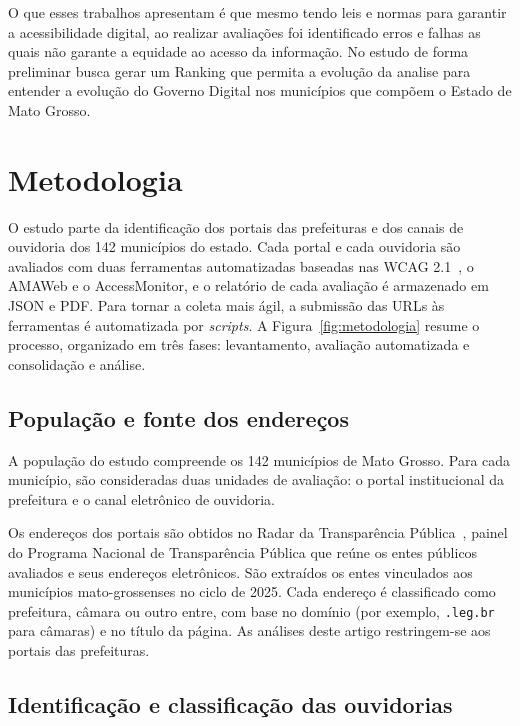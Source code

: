 \documentclass[12pt]{article}
\begin{document}
O que esses trabalhos apresentam é que mesmo tendo leis e normas para garantir a acessibilidade digital, ao realizar avaliações foi identificado erros e falhas as quais não garante a equidade ao acesso da informação. No estudo de forma preliminar busca gerar um Ranking que permita a evolução da analise para entender a evolução do Governo Digital nos municípios que compõem o Estado de Mato Grosso. 
\section{Metodologia}

O estudo parte da identificação dos portais das prefeituras e dos canais de ouvidoria dos 142 municípios do estado. Cada portal e cada ouvidoria são avaliados com duas ferramentas automatizadas baseadas nas WCAG 2.1~\cite{wcag21}, o AMAWeb e o AccessMonitor, e o relatório de cada avaliação é armazenado em JSON e PDF. Para tornar a coleta mais ágil, a submissão das URLs às ferramentas é automatizada por \textit{scripts}. A Figura~\ref{fig:metodologia} resume o processo, organizado em três fases: levantamento, avaliação automatizada e consolidação e análise.



\subsection{População e fonte dos endereços}

A população do estudo compreende os 142 municípios de Mato Grosso. Para cada município, são consideradas duas unidades de avaliação: o portal institucional da prefeitura e o canal eletrônico de ouvidoria.

Os endereços dos portais são obtidos no Radar da Transparência Pública~\cite{radar}, painel do Programa Nacional de Transparência Pública que reúne os entes públicos avaliados e seus endereços eletrônicos. São extraídos os entes vinculados aos municípios mato-grossenses no ciclo de 2025. Cada endereço é classificado como prefeitura, câmara ou outro entre, com base no domínio (por exemplo, \texttt{.leg.br} para câmaras) e no título da página. As análises deste artigo restringem-se aos portais das prefeituras.

\subsection{Identificação e classificação das ouvidorias}
\end{document}
